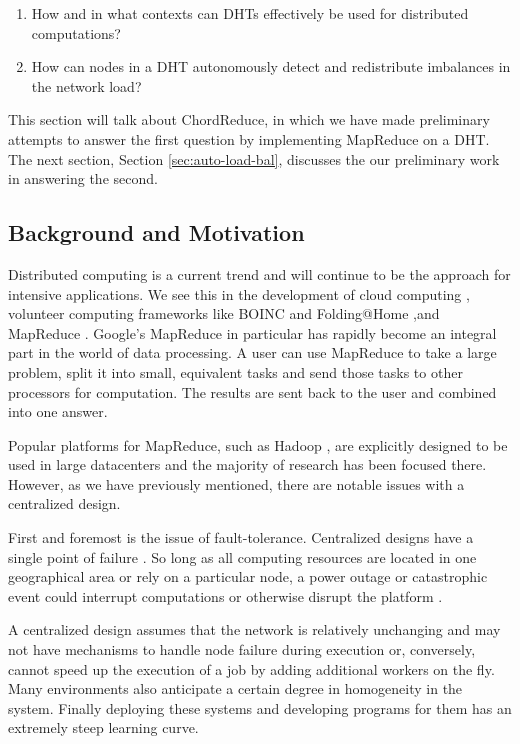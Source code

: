 \begin{enumerate}
	\item How and in what contexts  can DHTs effectively be used for distributed computations?
	\item How can nodes in a DHT autonomously detect and redistribute imbalances in the network load?
\end{enumerate}

This section will talk about ChordReduce, in which we have made preliminary attempts to answer the first question by implementing MapReduce on a DHT.
The next section, Section \ref{sec:auto-load-bal}, discusses the our preliminary work in answering the second.

\subsection{Background and Motivation}

Distributed computing is a current trend and will continue to be the approach for intensive  applications.
We see this in the development of cloud computing \cite{p2p-cloud}, volunteer computing frameworks like BOINC \cite{anderson2004boinc} and Folding@Home \cite{larson2002folding},and MapReduce  \cite{mapreduce}.
Google's MapReduce  in particular has rapidly become an integral part in the world of data processing.
A user can use MapReduce to take a large problem, split it into small, equivalent tasks and send those tasks to other processors for computation.
The results are sent back to the user and combined into one answer.

Popular platforms for MapReduce, such as Hadoop \cite{hadoop}  \cite{shvachko2010hadoop}, are explicitly designed to be used in large datacenters \cite{hadoopAssumptions} and the majority of research has been focused there.
However, as we have previously mentioned, there are notable issues with a centralized design.

First and foremost is the issue of fault-tolerance.
Centralized designs have a single point of failure \cite{shvachko2010hadoop}.
So long as all computing resources are located in one geographical area or rely on a particular node, a power outage or catastrophic event could interrupt computations or otherwise disrupt the platform \cite{babaoglu2014people}.

A centralized design assumes that the network is relatively unchanging and may not have mechanisms to handle node failure during execution or, conversely, cannot speed up the execution of a job by adding additional workers on the fly.
Many environments also anticipate a certain degree in homogeneity in the system.
Finally deploying these systems and developing programs for them has an extremely steep learning curve.

